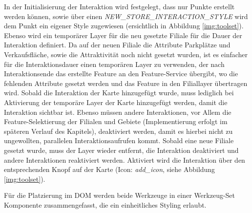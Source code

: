 In der Initialisierung der Interaktion wird festgelegt, dass nur Punkte erstellt werden können, sowie über einen \emph{NEW\_STORE\_INTERACTION\_STYLE} wird dem Punkt ein eigener Style zugewiesen (ersichtlich in Abbildung \ref{img:toolset}).
Ebenso wird ein temporärer Layer für die neu gesetzte Filiale für die Dauer der Interaktion definiert.
Da auf der neuen Filiale die Attribute Parkplätze und Verkaufsfläche, sowie die Attraktivität noch nicht gesetzt wurden, ist es einfacher für die Interaktionsdauer einen temporären Layer zu verwenden, der nach Interaktionsende das erstellte Feature an den Feature-Service übergibt, wo die fehlenden Attribute gesetzt werden und das Feature in den Filiallayer übertragen wird. 
Sobald die Interaktion der Karte hinzugefügt wurde, muss lediglich bei Aktivierung der temporäre Layer der Karte hinzugefügt werden, damit die Interaktion sichtbar ist.
Ebenso müssen andere Interaktionen, vor Allem die Feature-Selektierung der Filialen und Gebiete (Implementierung erfolgt im späteren Verlauf des Kapitels), deaktiviert werden, damit es hierbei nicht zu ungewollten, parallelen Interaktionsaufrufen kommt.
Sobald eine neue Filiale gesetzt wurde, muss der Layer wieder entfernt, die Interaktion deaktiviert und andere Interaktionen reaktiviert werden.
Aktiviert wird die Interaktion über den entsprechenden Knopf auf der Karte (Icon: \emph{add\_icon}, siehe Abbildung \ref{img:toolset}).

Für die Platzierung im DOM werden beide Werkzeuge in einer Werkzeug-Set Komponente zusammengefasst, die ein einheitliches Styling erlaubt.

